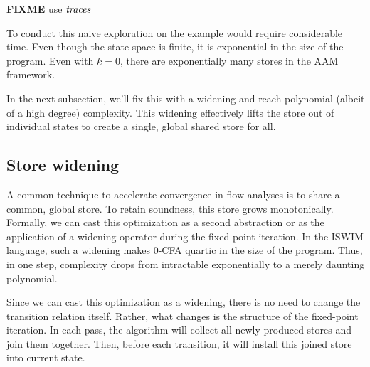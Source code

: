 \documentclass[preprint,onecolumn,9pt]{sigplanconf} %
\newcommand{\naive}{naive}
\begin{document}
{\bf FIXME} use $\mathit{traces}$

To conduct this \naive{} exploration on the \Church{} example would require
considerable time.  Even though the state space is finite, it is exponential in
the size of the program.  Even with $k = 0$, there are exponentially many
stores in the AAM framework.

In the next subsection, we'll fix this with a widening and reach polynomial
(albeit of a high degree) complexity.
%
This widening effectively lifts the store out of individual states to create
a single, global shared store for all.


\subsection{Store widening}
\label{sec:storewiden}

A common technique to accelerate convergence in flow analyses is to share a
common, global store.
%
To retain soundness, this store grows monotonically.
%
Formally, we can cast this optimization as a second abstraction or as the
application of a widening operator during the fixed-point iteration.
%
In the ISWIM language, such a widening makes 0-CFA quartic in the size of the
program.
%
Thus, in one step, complexity drops from intractable exponentially to a merely
daunting polynomial.

Since we can cast this optimization as a widening, there is no need to change
the transition relation itself.
%
Rather, what changes is the structure of the fixed-point iteration.
%
In each pass, the algorithm will collect all newly produced stores and join
them together.
%
Then, before each transition, it will install this joined store into current
state.
\end{document}
